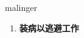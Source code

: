 
\begin{frame}
{\huge malinger}
\begin{center}
\begin{enumerate}\Large
  \item \textbf{装病以逃避工作}
\end{enumerate}
\end{center}
\end{frame}
